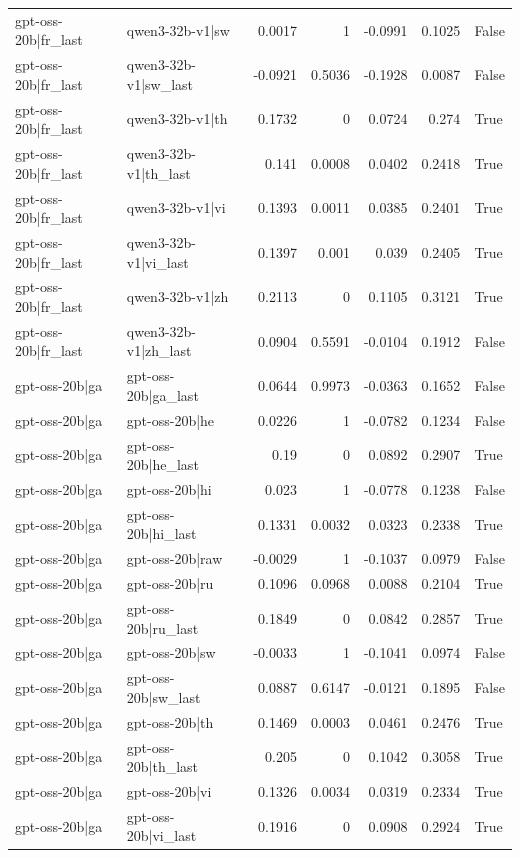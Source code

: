 \begin{table}
\begin{tabular}{l l r r r r l}
gpt-oss-20b|fr_last & qwen3-32b-v1|sw & 0.0017 & 1 & -0.0991 & 0.1025 & False \\
gpt-oss-20b|fr_last & qwen3-32b-v1|sw_last & -0.0921 & 0.5036 & -0.1928 & 0.0087 & False \\
gpt-oss-20b|fr_last & qwen3-32b-v1|th & 0.1732 & 0 & 0.0724 & 0.274 & True \\
gpt-oss-20b|fr_last & qwen3-32b-v1|th_last & 0.141 & 0.0008 & 0.0402 & 0.2418 & True \\
gpt-oss-20b|fr_last & qwen3-32b-v1|vi & 0.1393 & 0.0011 & 0.0385 & 0.2401 & True \\
gpt-oss-20b|fr_last & qwen3-32b-v1|vi_last & 0.1397 & 0.001 & 0.039 & 0.2405 & True \\
gpt-oss-20b|fr_last & qwen3-32b-v1|zh & 0.2113 & 0 & 0.1105 & 0.3121 & True \\
gpt-oss-20b|fr_last & qwen3-32b-v1|zh_last & 0.0904 & 0.5591 & -0.0104 & 0.1912 & False \\
gpt-oss-20b|ga & gpt-oss-20b|ga_last & 0.0644 & 0.9973 & -0.0363 & 0.1652 & False \\
gpt-oss-20b|ga & gpt-oss-20b|he & 0.0226 & 1 & -0.0782 & 0.1234 & False \\
gpt-oss-20b|ga & gpt-oss-20b|he_last & 0.19 & 0 & 0.0892 & 0.2907 & True \\
gpt-oss-20b|ga & gpt-oss-20b|hi & 0.023 & 1 & -0.0778 & 0.1238 & False \\
gpt-oss-20b|ga & gpt-oss-20b|hi_last & 0.1331 & 0.0032 & 0.0323 & 0.2338 & True \\
gpt-oss-20b|ga & gpt-oss-20b|raw & -0.0029 & 1 & -0.1037 & 0.0979 & False \\
gpt-oss-20b|ga & gpt-oss-20b|ru & 0.1096 & 0.0968 & 0.0088 & 0.2104 & True \\
gpt-oss-20b|ga & gpt-oss-20b|ru_last & 0.1849 & 0 & 0.0842 & 0.2857 & True \\
gpt-oss-20b|ga & gpt-oss-20b|sw & -0.0033 & 1 & -0.1041 & 0.0974 & False \\
gpt-oss-20b|ga & gpt-oss-20b|sw_last & 0.0887 & 0.6147 & -0.0121 & 0.1895 & False \\
gpt-oss-20b|ga & gpt-oss-20b|th & 0.1469 & 0.0003 & 0.0461 & 0.2476 & True \\
gpt-oss-20b|ga & gpt-oss-20b|th_last & 0.205 & 0 & 0.1042 & 0.3058 & True \\
gpt-oss-20b|ga & gpt-oss-20b|vi & 0.1326 & 0.0034 & 0.0319 & 0.2334 & True \\
gpt-oss-20b|ga & gpt-oss-20b|vi_last & 0.1916 & 0 & 0.0908 & 0.2924 & True \\

\end{tabular}
\end{table}
